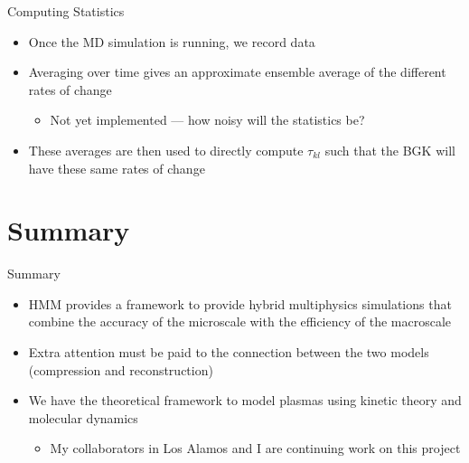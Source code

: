\documentclass{beamer}
\begin{document}
	
		\begin{frame}{Computing Statistics}
		\begin{itemize}
			\item Once the MD simulation is running, we record data
			\vspace{1em}
			\item Averaging over time gives an approximate ensemble average of the different rates of change
			\vspace{1em}
			\begin{itemize}
			\item Not yet implemented --- how noisy will the statistics be?
			\end{itemize}
			\vspace{1em}
			\item These averages are then used to directly compute $\tau_{kl}$ such that the BGK will have these same rates of change
		\end{itemize}
	\end{frame}
	
	\section{Summary}
	\begin{frame}{Summary}
		\begin{itemize}
			\item HMM provides a framework to provide hybrid multiphysics simulations that combine the accuracy of the microscale with the efficiency of the macroscale
			\vspace{1em}
			\item Extra attention must be paid to the connection between the two models (compression and reconstruction)
			\vspace{1em}
			\item We have the theoretical framework to model plasmas using kinetic theory and molecular dynamics
			\vspace{1em}
			\begin{itemize}
			\item My collaborators in Los Alamos and I are continuing work on this project
			\end{itemize}
		\end{itemize}
	\end{frame}
	




	
\end{document}
